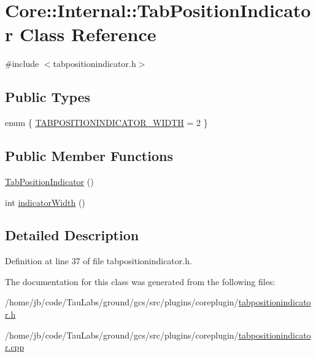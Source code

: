 \hypertarget{class_core_1_1_internal_1_1_tab_position_indicator}{\section{\-Core\-:\-:\-Internal\-:\-:\-Tab\-Position\-Indicator \-Class \-Reference}
\label{class_core_1_1_internal_1_1_tab_position_indicator}
}


{\ttfamily \#include $<$tabpositionindicator.\-h$>$}

\subsection*{\-Public \-Types}
\begin{DoxyCompactItemize}
\item 
enum \{ \hyperlink{group___core_plugin_gga72fa4b694489732ffd60e01c46624b51ad22687e73a02e0040f229636561a0baa}{\-T\-A\-B\-P\-O\-S\-I\-T\-I\-O\-N\-I\-N\-D\-I\-C\-A\-T\-O\-R\-\_\-\-W\-I\-D\-T\-H} =  2
 \}
\end{DoxyCompactItemize}
\subsection*{\-Public \-Member \-Functions}
\begin{DoxyCompactItemize}
\item 
\hyperlink{group___core_plugin_ga4452856fc2ef86ff364a8943287aacd1}{\-Tab\-Position\-Indicator} ()
\item 
int \hyperlink{group___core_plugin_gac5f4584d94f1a19b15ac016da901d644}{indicator\-Width} ()
\end{DoxyCompactItemize}


\subsection{\-Detailed \-Description}


\-Definition at line 37 of file tabpositionindicator.\-h.



\-The documentation for this class was generated from the following files\-:\begin{DoxyCompactItemize}
\item 
/home/jb/code/\-Tau\-Labs/ground/gcs/src/plugins/coreplugin/\hyperlink{tabpositionindicator_8h}{tabpositionindicator.\-h}\item 
/home/jb/code/\-Tau\-Labs/ground/gcs/src/plugins/coreplugin/\hyperlink{tabpositionindicator_8cpp}{tabpositionindicator.\-cpp}\end{DoxyCompactItemize}
